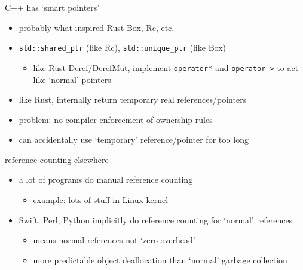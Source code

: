 \begin{frame}{C++ has `smart pointers'}
    \begin{itemize}
    \item probably what inspired Rust Box, Rc, etc.
    \vspace{.5cm}
    \item \texttt{std::shared\_ptr} (like Rc), \texttt{std::unique\_ptr} (like Box)
        \begin{itemize}
        \item like Rust Deref/DerefMut, implement \texttt{operator*} and \texttt{operator->} to act
            like `normal' pointers
        \end{itemize}
    \item like Rust, internally return temporary real references/pointers
    \vspace{.5cm}
    \item problem: no compiler enforcement of ownership rules
    \item can accidentally use `temporary' reference/pointer for too long
    \end{itemize}
\end{frame}

\begin{frame}{reference counting elsewhere}
    \begin{itemize}
    \item a lot of programs do manual reference counting
        \begin{itemize}
        \item example: lots of stuff in Linux kernel
        \end{itemize}
    \item Swift, Perl, Python implicitly do reference counting for `normal' references  
        \begin{itemize}
        \item means normal references not `zero-overhead'
        \item more predictable object deallocation than `normal' garbage collection
        \end{itemize}
    \end{itemize}
\end{frame}
